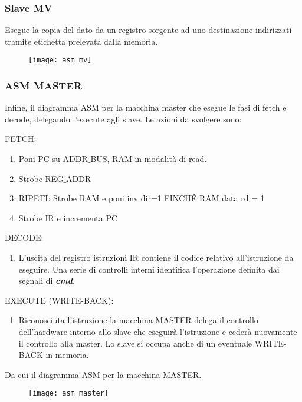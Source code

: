 \newpage
\subsubsection{Slave MV}
Esegue la copia del dato da un registro sorgente ad uno destinazione indirizzati tramite etichetta prelevata dalla memoria.
\begin{figure}[H]
	\centering
	\texttt{[image: asm\_mv]}
	\label{fig:asm_mv}
\end{figure}

\newpage
\subsubsection{ASM MASTER}
Infine, il diagramma ASM per la macchina master che esegue le fasi di fetch e decode, delegando l'execute agli slave. Le azioni da svolgere sono:\\
\par \bigskip \noindent
FETCH:
\begin{enumerate}
	\item Poni PC su ADDR$\_$BUS, RAM in modalità di read.
	\item Strobe REG$\_$ADDR
	\item RIPETI: Strobe RAM e poni inv$\_$dir=1 FINCHÉ RAM$\_$data$\_$rd = 1
	\item Strobe IR e incrementa PC
\end{enumerate}

\par \bigskip \noindent
DECODE:
\begin{enumerate}
	\item L'uscita del registro istruzioni IR contiene il codice relativo all'istruzione da eseguire. Una serie di controlli interni identifica l'operazione definita dai segnali di \textbf{\textit{cmd}}.
\end{enumerate}

\par \bigskip \noindent
EXECUTE (WRITE-BACK):
\begin{enumerate}
	\item Riconosciuta l'istruzione la macchina MASTER delega il controllo dell'hardware interno allo slave che eseguirà l'istruzione e cederà nuovamente il controllo alla master. Lo slave si occupa anche di un eventuale WRITE-BACK in memoria.
\end{enumerate}

\noindent
Da cui il diagramma ASM per la macchina MASTER.
\begin{figure}[H]
	\centering
	\texttt{[image: asm\_master]}
	\label{fig:asm_master}
\end{figure}

